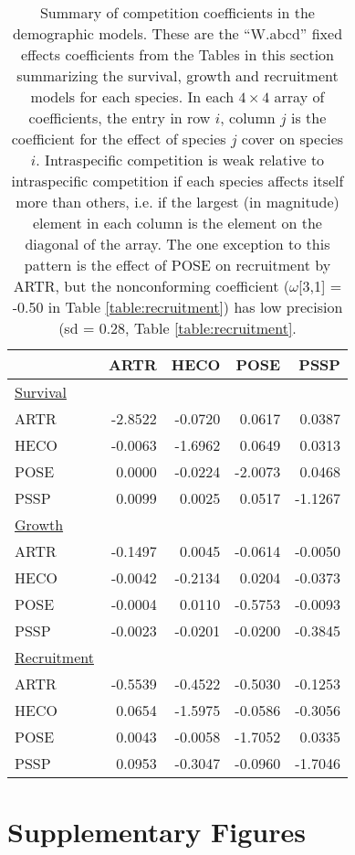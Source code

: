 \documentclass[11pt]{article}
\begin{document}
\newpage 
\begin{table}[ht]
\centering
\caption{Summary of competition coefficients in the demographic models. These are the ``W.abcd'' fixed effects coefficients from
the Tables in this section summarizing the survival, growth and recruitment models for each species.  
In each $4 \times 4$ array of coefficients, the entry in row $i$, column $j$ is the 
coefficient for the effect of species $j$ cover on species $i$. Intraspecific competition is weak relative to intraspecific competition if each
species affects itself more than others, i.e. if the largest (in magnitude) element in each column is the element on the diagonal of the array.
The one exception to this pattern is the effect of POSE on recruitment by ARTR, but the nonconforming
coefficient ($\omega$[3,1] = -0.50 in Table \ref{table:recruitment}) has low precision (sd = 0.28, Table \ref{table:recruitment}.} 
\label{table:alphas}
\begin{tabular}{lrrrr}
       & ARTR &  HECO &  POSE &  PSSP \\
\hline 
\underline{Survival} & & & & \\        
ARTR & -2.8522 & -0.0720 & 0.0617 & 0.0387\\
HECO & -0.0063 & -1.6962 & 0.0649 & 0.0313\\
POSE & 0.0000 & -0.0224 & -2.0073 & 0.0468\\
PSSP & 0.0099 & 0.0025 & 0.0517 & -1.1267\\
\underline{Growth} & & & & \\ 
ARTR & -0.1497 & 0.0045 & -0.0614 & -0.0050\\
HECO & -0.0042 & -0.2134 & 0.0204 & -0.0373\\
POSE & -0.0004 & 0.0110 & -0.5753 & -0.0093\\
PSSP & -0.0023 & -0.0201 & -0.0200 & -0.3845\\
\underline{Recruitment} & & & & \\ 
ARTR & -0.5539 & -0.4522 & -0.5030 & -0.1253\\
HECO &  0.0654 & -1.5975 & -0.0586 & -0.3056\\
POSE & 0.0043 & -0.0058 & -1.7052 & 0.0335\\
PSSP & 0.0953 & -0.3047 & -0.0960 & -1.7046\\
\hline
\end{tabular}
\end{table}

\clearpage

\section{Supplementary Figures} 
\end{document}
